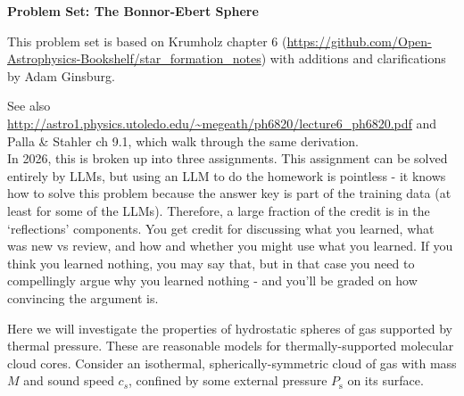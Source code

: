 \documentclass{article}
\begin{document}
\noindent\textbf{Problem Set: The Bonnor-Ebert Sphere}

This problem set is based on Krumholz chapter 6
(\url{https://github.com/Open-Astrophysics-Bookshelf/star_formation_notes})
with additions and clarifications by Adam Ginsburg.

See also
\url{http://astro1.physics.utoledo.edu/~megeath/ph6820/lecture6_ph6820.pdf} and
Palla \& Stahler ch 9.1,
which walk through the same derivation.   
\\

In 2026, this is broken up into three assignments.  
This assignment can be solved entirely by LLMs, but using an LLM to do the homework is pointless - it knows how to solve this problem because the answer key is part of the training data (at least for some of the LLMs).
Therefore, a large fraction of the credit is in the `reflections' components.
You get credit for discussing what you learned, what was new vs review, and how and whether you might use what you learned.
If you think you learned nothing, you may say that, but in that case you need to compellingly argue why you learned nothing - and you'll be graded on how convincing the argument is.

Here we will investigate the properties of hydrostatic spheres of gas supported
by thermal pressure. These are reasonable models for thermally-supported
molecular cloud cores. Consider an isothermal, spherically-symmetric cloud of
gas with mass $M$ and sound speed $c_s$, confined by some external pressure
$P_{\mathrm{s}}$ on its surface.
\end{document}

